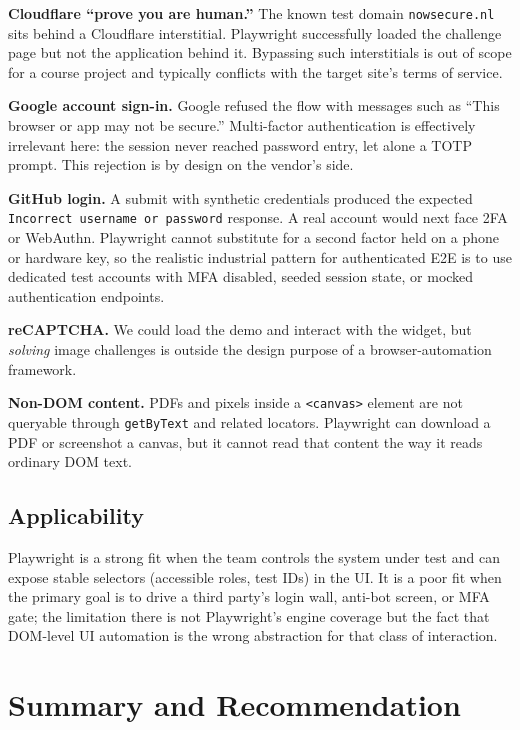 \documentclass[12pt,letterpaper]{article}
\newcommand{\code}[1]{\texttt{#1}}
\begin{document}
\textbf{Cloudflare ``prove you are human.''} The known test domain \code{nowsecure.nl} sits behind a Cloudflare interstitial. Playwright successfully loaded the challenge page but not the application behind it. Bypassing such interstitials is out of scope for a course project and typically conflicts with the target site's terms of service.

\textbf{Google account sign-in.} Google refused the flow with messages such as ``This browser or app may not be secure.'' Multi-factor authentication is effectively irrelevant here: the session never reached password entry, let alone a TOTP prompt. This rejection is by design on the vendor's side.

\textbf{GitHub login.} A submit with synthetic credentials produced the expected \code{Incorrect username or password} response. A real account would next face 2FA or WebAuthn. Playwright cannot substitute for a second factor held on a phone or hardware key, so the realistic industrial pattern for authenticated E2E is to use dedicated test accounts with MFA disabled, seeded session state, or mocked authentication endpoints.

\textbf{reCAPTCHA.} We could load the demo and interact with the widget, but \emph{solving} image challenges is outside the design purpose of a browser-automation framework.

\textbf{Non-DOM content.} PDFs and pixels inside a \code{<canvas>} element are not queryable through \code{getByText} and related locators. Playwright can download a PDF or screenshot a canvas, but it cannot read that content the way it reads ordinary DOM text.

\subsection{Applicability}

Playwright is a strong fit when the team controls the system under test and can expose stable selectors (accessible roles, test IDs) in the UI. It is a poor fit when the primary goal is to drive a third party's login wall, anti-bot screen, or MFA gate; the limitation there is not Playwright's engine coverage but the fact that DOM-level UI automation is the wrong abstraction for that class of interaction.

\section{Summary and Recommendation}
\end{document}

